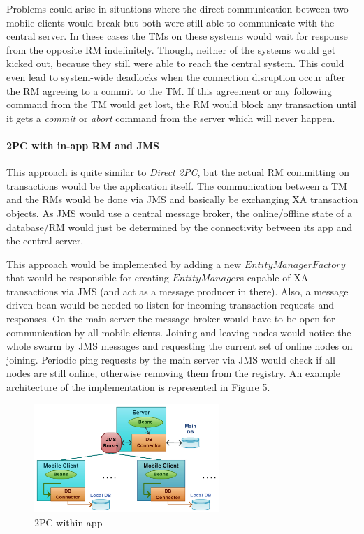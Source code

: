 \documentclass[twoside,colorbacktitle,accentcolor=tud1b]{tudexercise}
\begin{document}
Problems could arise in situations where the direct communication between two mobile clients would break but both were still able to communicate with the central server. In these cases the \ac{TM}s on these systems would wait for response from the opposite \ac{RM} indefinitely.
Though, neither of the systems would get kicked out, because they still were able to reach the central system.
This could even lead to system-wide deadlocks when the connection disruption occur after the \ac{RM} agreeing to a commit to the \ac{TM}.
If this agreement or any following command from the \ac{TM} would get lost, the \ac{RM} would block any transaction until it gets a \textit{commit} or \textit{abort} command from the server which will never happen.

\paragraph{2PC with in-app \ac{RM} and JMS}
This approach is quite similar to \textit{Direct 2PC}, but the actual \ac{RM} committing on transactions would be the application itself.
The communication between a \ac{TM} and the \ac{RM}s would be done via JMS and basically be exchanging \ac{XA} transaction objects.
As JMS would use a central message broker, the online/offline state of a database/\ac{RM} would just be determined by the connectivity between its app and the central server.

This approach would be implemented by adding a new $EntityManagerFactory$ that would be responsible for creating $EntityManager$s capable of \ac{XA} transactions via JMS (and act as a message producer in there).
Also, a message driven bean would be needed to listen for incoming transaction requests and responses.
On the main server the message broker would have to be open for communication by all mobile clients.
Joining and leaving nodes would notice the whole swarm by JMS messages and requesting the current set of online nodes on joining.
Periodic ping requests by the main server via JMS would check if all nodes are still online, otherwise removing them from the registry.  An example architecture of the implementation is represented in Figure 5.

\begin{figure}[h!]
  \centering
   \includegraphics[width=70mm]{2pc}
   \caption{2PC within app}
\end{figure}
\end{document}
